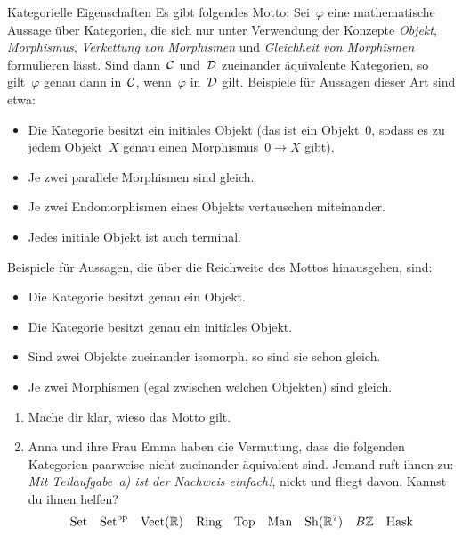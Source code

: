 \documentclass{uebblatt}
\begin{document}
\begin{aufgabe}{Kategorielle Eigenschaften}
Es gibt folgendes Motto: Sei~$\varphi$ eine mathematische Aussage über Kategorien, die
sich nur unter Verwendung der Konzepte \emph{Objekt}, \emph{Morphismus},
\emph{Verkettung von Morphismen} und \emph{Gleichheit von Morphismen}
formulieren lässt. Sind dann~$\mathcal{C}$ und~$\mathcal{D}$ zueinander äquivalente Kategorien,
so gilt~$\varphi$ genau dann in~$\mathcal{C}$, wenn~$\varphi$ in~$\mathcal{D}$ gilt.
Beispiele für Aussagen dieser Art sind etwa:
\begin{itemize}
\item Die Kategorie besitzt ein initiales Objekt (das ist ein Objekt~$0$,
sodass es zu jedem Objekt~$X$ genau einen Morphismus~$0 \to X$ gibt).
\item Je zwei parallele Morphismen sind gleich.
\item Je zwei Endomorphismen eines Objekts vertauschen miteinander.
\item Jedes initiale Objekt ist auch terminal.
\end{itemize}
Beispiele für Aussagen, die über die Reichweite des Mottos hinausgehen, sind:
\begin{itemize}
\item Die Kategorie besitzt genau ein Objekt.
\item Die Kategorie besitzt genau ein initiales Objekt.
\item Sind zwei Objekte zueinander isomorph, so sind sie schon gleich.
\item Je zwei Morphismen (egal zwischen welchen Objekten) sind gleich.
\end{itemize}

\begin{enumerate}
\item Mache dir klar, wieso das Motto gilt.
\item Anna und ihre Frau Emma haben die Vermutung, dass die folgenden
Kategorien paarweise nicht zueinander äquivalent sind. Jemand ruft ihnen zu:
\emph{Mit Teilaufgabe~a) ist der Nachweis einfach!}, nickt und fliegt davon. Kannst du ihnen
helfen?
\[ \mathrm{Set} \quad
  \mathrm{Set}^{\mathrm{op}} \quad
  \mathrm{Vect}(\mathbb{R}) \quad
  \mathrm{Ring} \quad
  \mathrm{Top} \quad
  \mathrm{Man} \quad
  \mathrm{Sh}(\mathbb{R}^7) \quad
  B\mathbb{Z} \quad
  \mathrm{Hask}
\]
\end{enumerate}
\end{aufgabe}
\newpage
\end{document}
